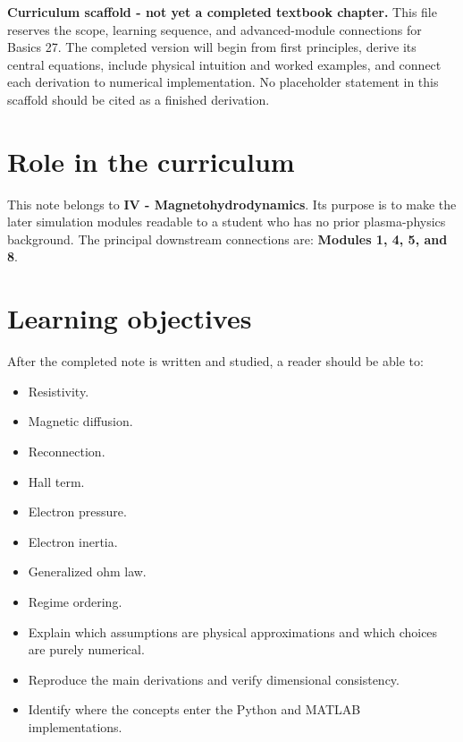 \documentclass[11pt]{article}
\begin{document}

\begin{overviewbox}
\textbf{Curriculum scaffold - not yet a completed textbook chapter.} This file reserves the scope, learning sequence, and advanced-module connections for Basics 27. The completed version will begin from first principles, derive its central equations, include physical intuition and worked examples, and connect each derivation to numerical implementation. No placeholder statement in this scaffold should be cited as a finished derivation.
\end{overviewbox}

\ProjectTOC

\section{Role in the curriculum}
This note belongs to \textbf{IV - Magnetohydrodynamics}. Its purpose is to make the later simulation modules readable to a student who has no prior plasma-physics background. The principal downstream connections are: \textbf{Modules 1, 4, 5, and 8}.

\section{Learning objectives}
After the completed note is written and studied, a reader should be able to:
\begin{itemize}[leftmargin=1.6em]
\item Resistivity.
\item Magnetic diffusion.
\item Reconnection.
\item Hall term.
\item Electron pressure.
\item Electron inertia.
\item Generalized ohm law.
\item Regime ordering.
\item Explain which assumptions are physical approximations and which choices are purely numerical.
\item Reproduce the main derivations and verify dimensional consistency.
\item Identify where the concepts enter the Python and MATLAB implementations.
\end{itemize}
\end{document}
